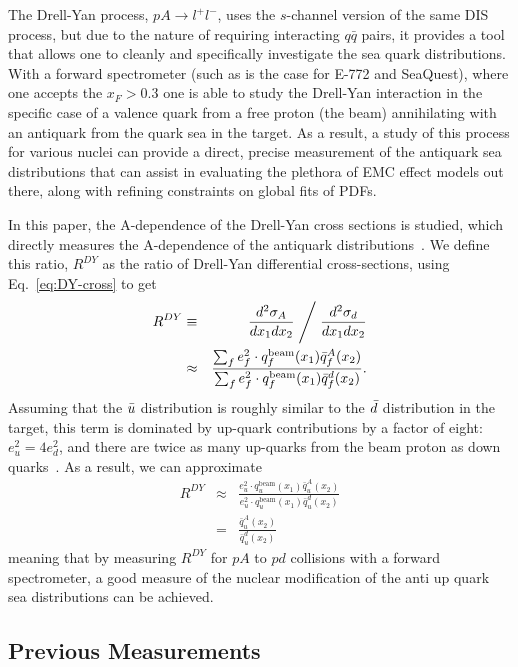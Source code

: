 The Drell-Yan process, $pA\rightarrow l^+l^-$, uses the $s$-channel version of the same DIS process, but due to the nature of requiring interacting $q\bar{q}$ pairs, it provides a tool that allows one to cleanly and specifically investigate the sea quark distributions. With a forward spectrometer (such as is the case for E-772 and SeaQuest), where one accepts the $x_F>0.3$ one is able to study the Drell-Yan interaction in the specific case of a valence quark from a free proton (the beam) annihilating with an antiquark from the quark sea in the target. As a result, a study of this process for various nuclei can provide a direct, precise measurement of the antiquark sea distributions that can assist in evaluating the plethora of EMC effect models out there, along with refining constraints on global fits of PDFs.

In this paper, the A-dependence of the Drell-Yan cross sections is studied, which directly measures the A-dependence of the antiquark distributions~\cite{Berger:1985dr}. We define this ratio, $R^{DY}$ as the ratio of Drell-Yan differential cross-sections, using Eq.~\ref{eq:DY-cross} to get
\begin{eqnarray}
R^{DY} & \equiv & \frac{d^2\sigma_A}{dx_1 dx_2} \Biggm/ \frac{d^2\sigma_d}{dx_1 dx_2} \\
& \approx & \frac{\sum_f e_f^2 \cdot q_f^{\text{beam}}(x_1) \bar{q}_f^A(x_2)}{\sum_f e_f^2 \cdot q_f^{\text{beam}}(x_1) \bar{q}_f^d(x_2)}.
\end{eqnarray}
Assuming that the $\bar{u}$ distribution is roughly similar to the $\bar{d}$ distribution in the target, this term is dominated by up-quark contributions by a factor of eight: $e_u^2 = 4 e_d^2$, and there are twice as many up-quarks from the beam proton as down quarks~\cite{Geesaman:1995yd}. As a result, we can approximate
\begin{eqnarray}
R^{DY} & \approx & \frac{e_u^2 \cdot q_u^{\text{beam}}(x_1) \bar{q}^A_u(x_2)}{e_u^2 \cdot q_u^{\text{beam}}(x_1) \bar{q}^d_u(x_2)} \\ 
& = & \frac{\bar{q}_u^A(x_2)}{\bar{q}_u^d(x_2)}
\end{eqnarray}
meaning that by measuring $R^{DY}$ for $pA$ to $pd$ collisions with a forward spectrometer, a good measure of the nuclear modification of the anti up quark sea distributions can be achieved.

\subsection{Previous Measurements}

